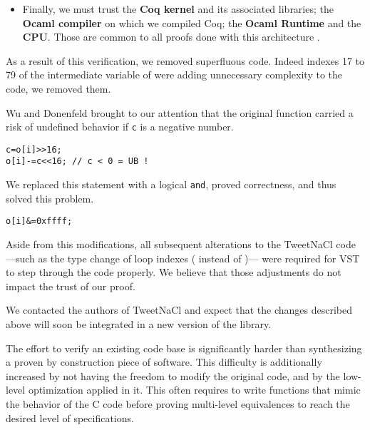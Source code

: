 \begin{itemize}
  \item Finally, we must trust the \textbf{Coq kernel} and its
        associated libraries; the \textbf{Ocaml compiler} on which we compiled Coq;
        the \textbf{Ocaml Runtime} and the \textbf{CPU}. Those are common to all proofs
        done with this architecture \cite{2015-Appel,coq-faq}.
\end{itemize}

As a result of this verification, we removed superfluous code.
Indeed indexes 17 to 79 of the  intermediate variable of
 were adding unnecessary complexity to the code,
we removed them.

Wu and Donenfeld brought to our attention that the original
 function carried a risk of undefined behavior if \texttt{c}
is a negative number.
\begin{lstlisting}[language=Ctweetnacl,stepnumber=0]
c=o[i]>>16;
o[i]-=c<<16; // c < 0 = UB !
\end{lstlisting}
We replaced this statement with a logical \texttt{and}, proved correctness,
and thus solved this problem.
\begin{lstlisting}[language=Ctweetnacl,stepnumber=0]
o[i]&=0xffff;
\end{lstlisting}

Aside from this modifications, all subsequent alterations to the TweetNaCl code%
---such as the type change of loop indexes ( instead of )---%
were required for VST to step through the code properly. We believe that those
adjustments do not impact the trust of our proof.

We contacted the authors of TweetNaCl and expect that the changes described
above will soon be integrated in a new version of the library.




 The effort to verify an existing code base is
significantly harder than synthesizing a proven by construction piece of software.
This difficulty is additionally increased by not having the freedom to modify
the original code, and by the low-level optimization applied in it.
This often requires to write functions that mimic the behavior of the C
code before proving multi-level equivalences to reach the desired level of specifications.

